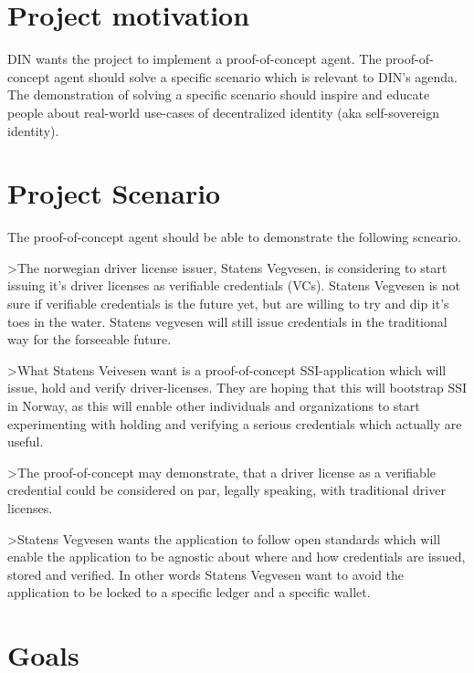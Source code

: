 \section{Project motivation}

DIN wants the project to implement a proof-of-concept agent. The proof-of-concept agent should solve a specific scenario which is relevant to DIN's agenda. The demonstration of solving a specific scenario should inspire and educate people about real-world use-cases of decentralized identity (aka self-sovereign identity).



\newpage

\section{Project Scenario}

The proof-of-concept agent should be able to demonstrate the following scneario.

>The norwegian driver license issuer, Statens Vegvesen, is considering to start issuing it's driver licenses as verifiable credentials (VCs). Statens Vegvesen is not sure if verifiable credentials is the future yet, but are willing to try and dip it's toes in the water. Statens vegvesen will still issue credentials in the traditional way for the forseeable future.

>What Statens Veivesen want is a proof-of-concept SSI-application which will issue, hold and verify driver-licenses. They are hoping that this will bootstrap SSI in Norway, as this will enable other individuals and organizations to start experimenting with holding and verifying a serious credentials which actually are useful.

>The proof-of-concept may demonstrate, that a driver license as a verifiable credential could be considered on par, legally speaking, with traditional driver licenses.

>Statens Vegvesen wants the application to follow open standards which will enable the application to be agnostic about where and how credentials are issued, stored and verified. In other words Statens Vegvesen want to avoid the application to be locked to a specific ledger and a specific wallet.




\section{Goals}

